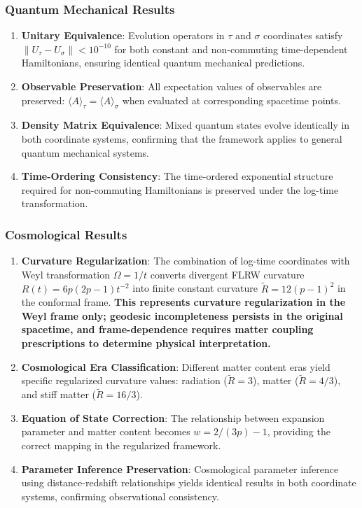 \subsubsection{Quantum Mechanical Results}

\begin{enumerate}
\item \textbf{Unitary Equivalence}: Evolution operators in $\tau$ and $\sigma$ coordinates satisfy $\|U_\tau - U_\sigma\| < 10^{-10}$ for both constant and non-commuting time-dependent Hamiltonians, ensuring identical quantum mechanical predictions.

\item \textbf{Observable Preservation}: All expectation values of observables are preserved: $\langle A \rangle_\tau = \langle A \rangle_\sigma$ when evaluated at corresponding spacetime points.

\item \textbf{Density Matrix Equivalence}: Mixed quantum states evolve identically in both coordinate systems, confirming that the framework applies to general quantum mechanical systems.

\item \textbf{Time-Ordering Consistency}: The time-ordered exponential structure required for non-commuting Hamiltonians is preserved under the log-time transformation.
\end{enumerate}

\subsubsection{Cosmological Results}

\begin{enumerate}
\item \textbf{Curvature Regularization}: The combination of log-time coordinates with Weyl transformation $\Omega = 1/t$ converts divergent FLRW curvature $R(t) = 6p(2p-1)t^{-2}$ into finite constant curvature $\tilde{R} = 12(p-1)^2$ in the conformal frame. \textbf{This represents curvature regularization in the Weyl frame only; geodesic incompleteness persists in the original spacetime, and frame-dependence requires matter coupling prescriptions to determine physical interpretation.}

\item \textbf{Cosmological Era Classification}: Different matter content eras yield specific regularized curvature values: radiation ($\tilde{R} = 3$), matter ($\tilde{R} = 4/3$), and stiff matter ($\tilde{R} = 16/3$).

\item \textbf{Equation of State Correction}: The relationship between expansion parameter and matter content becomes $w = 2/(3p) - 1$, providing the correct mapping in the regularized framework.

\item \textbf{Parameter Inference Preservation}: Cosmological parameter inference using distance-redshift relationships yields identical results in both coordinate systems, confirming observational consistency.
\end{enumerate}

